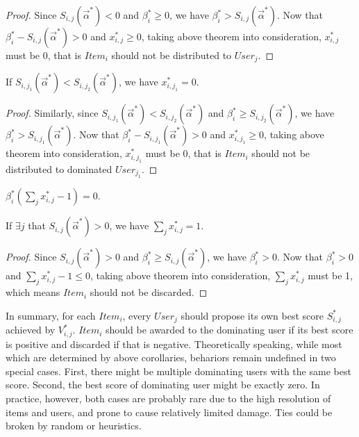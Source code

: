 \documentclass[sigconf]{acmart}
\newcommand{\sx}{x_{i,j}}
\newcommand{\sV}{V_{i,j}}
\newcommand{\sbeta}{\beta_i}
\newcommand{\sS}{S_{i,j}}
\newcommand{\valpha}{\vec{\alpha}}
\begin{document}
\begin{proof}
Since $\sS(\valpha^*) < 0$ and $\sbeta^* \ge 0$, we have $\sbeta^* > \sS(\valpha^*)$.
Now that $\sbeta^* - \sS(\valpha^*) > 0$ and $\sx^* \ge 0$,
    taking above theorem into consideration, $\sx^*$ must be 0,
    that is $Item_i$ should not be distributed to $User_j$.
\end{proof}

\begin{corollary}
If $S_{i,j_1}(\valpha^*) < S_{i,j_2}(\valpha^*)$, we have $x_{i,j_1}^* = 0$.
\end{corollary}

\begin{proof}
Similarly, since $S_{i,j_1}(\valpha^*) < S_{i,j_2}(\valpha^*)$ and $\sbeta^* \ge S_{i,j_2}(\valpha^*)$,
    we have $\sbeta^* > S_{i,j_1}(\valpha^*)$.
Now that $\sbeta^* - S_{i,j_1}(\valpha^*) > 0$ and $x_{i,j_1}^* \ge 0$, 
    taking above theorem into consideration, $x_{i,j_1}^*$ must be 0,
    that is $Item_i$ should not be distributed to dominated $User_{j_1}$.
\end{proof}

\begin{theorem}
$\sbeta^*(\sum\limits_j \sx^* - 1) = 0$.
\end{theorem}

\begin{corollary}
If $\exists j$ that $\sS(\valpha^*) > 0$, we have $\sum\limits_j \sx^* = 1$.
\end{corollary}

\begin{proof}
Since $\sS(\valpha^*) > 0$ and $\sbeta^* \ge \sS(\valpha^*)$, we have $\sbeta^* > 0$.
Now that $\sbeta^* > 0$ and $\sum\limits_j \sx^* - 1 \le 0$,
    taking above theorem into consideration, $\sum\limits_j \sx^*$ must be 1,
    which means $Item_i$ should not be discarded.
\end{proof}

In summary, for each $Item_i$, every $User_j$ should propose its own best score $\sS^*$ achieved by $\sV^*$.
$Item_i$ should be awarded to the dominating user if its best score is positive and discarded if that is negative.
Theoretically speaking, while most which are determined by above corollaries, behariors remain undefined in two special cases.
First, there might be multiple dominating users with the same best score.
Second, the best score of dominating user might be exactly zero.
In practice, however, both cases are probably rare due to the high resolution of items and users, and prone to cause relatively limited damage.
Ties could be broken by random or heuristics.
\end{document}
